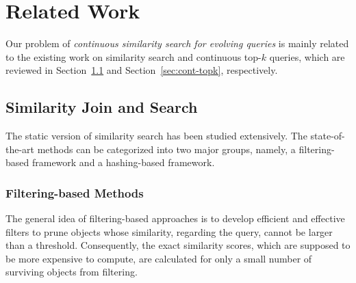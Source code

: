 
%
%

\chapter{Related Work}
\label{ch:related-work}

Our problem of \emph{continuous similarity search for evolving queries} is mainly related to the existing work on similarity search and continuous top-$k$ queries, which are reviewed in Section~\ref{sec:static-sim-search} and Section~\ref{sec:cont-topk}, respectively.   

\section{Similarity Join and Search}
\label{sec:static-sim-search}
The static version of similarity search has been studied extensively. The state-of-the-art methods can be categorized into two major groups, namely, a filtering-based framework and a hashing-based framework.

\subsection{Filtering-based Methods}
The general idea of filtering-based approaches is to develop efficient and effective filters to prune objects whose similarity, regarding the query, cannot be larger than a threshold.  Consequently, the exact similarity scores, which are supposed to be more expensive to compute, are calculated for only a small number of surviving objects from filtering.  

